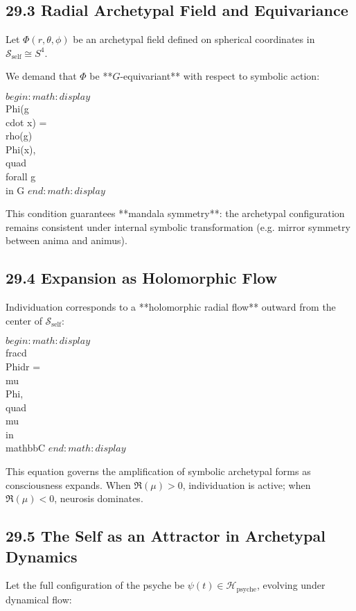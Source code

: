 \documentclass[12pt]{article}
\begin{document}
\begin{enumerate}
\subsection*{29.3 Radial Archetypal Field and Equivariance}

Let $\Phi(r, \theta, \phi)$ be an archetypal field defined on spherical coordinates in $\mathcal{S}_{\text{self}} \cong S^4$.

We demand that $\Phi$ be **$G$-equivariant** with respect to symbolic action:

$begin:math:display$
\\Phi(g \\cdot x) = \\rho(g) \\Phi(x), \\quad \\forall g \\in G
$end:math:display$

This condition guarantees **mandala symmetry**: the archetypal configuration remains consistent under internal symbolic transformation (e.g. mirror symmetry between anima and animus).

\subsection*{29.4 Expansion as Holomorphic Flow}

Individuation corresponds to a **holomorphic radial flow** outward from the center of $\mathcal{S}_{\text{self}}$:

$begin:math:display$
\\frac{d\\Phi}{dr} = \\mu \\Phi, \\quad \\mu \\in \\mathbb{C}
$end:math:display$

This equation governs the amplification of symbolic archetypal forms as consciousness expands. When $\Re(\mu) > 0$, individuation is active; when $\Re(\mu) < 0$, neurosis dominates.

\subsection*{29.5 The Self as an Attractor in Archetypal Dynamics}

Let the full configuration of the psyche be $\psi(t) \in \mathcal{H}_\text{psyche}$, evolving under dynamical flow:


\end{enumerate}
\end{document}
